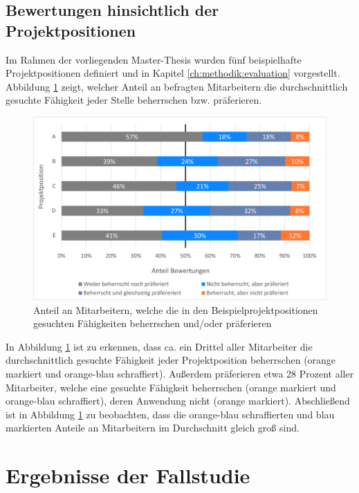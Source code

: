 \subsection{Bewertungen hinsichtlich der Projektpositionen}
\label{ch:ergebnisse:analyse:projektpositionen}
Im Rahmen der vorliegenden Master-Thesis wurden fünf beispielhafte Projektpositionen definiert und in Kapitel \ref{ch:methodik:evaluation} vorgestellt. Abbildung \ref{fig:ergebnisse:analyse:abb5} zeigt, welcher Anteil an befragten Mitarbeitern die durchschnittlich gesuchte Fähigkeit jeder Stelle beherrschen bzw. präferieren.

\begin{figure}[h]
	\centering
	\includegraphics[width=1\textwidth]{gfx/anteil-bewertungen-je-projektposition.png}
	\caption{Anteil an Mitarbeitern, welche die in den Beispielprojektpositionen gesuchten Fähigkeiten beherrschen und/oder präferieren}
	\label{fig:ergebnisse:analyse:abb5}
\end{figure}

In Abbildung \ref{fig:ergebnisse:analyse:abb5} ist zu erkennen, dass ca. ein Drittel aller Mitarbeiter die durchschnittlich gesuchte Fähigkeit jeder Projektposition beherrschen (orange markiert und orange-blau schraffiert). Außerdem präferieren etwa 28 Prozent aller Mitarbeiter, welche eine gesuchte Fähigkeit beherrschen (orange markiert und orange-blau schraffiert), deren Anwendung nicht (orange markiert). Abschließend ist in Abbildung \ref{fig:ergebnisse:analyse:abb5} zu beobachten, dass die orange-blau schraffierten und blau markierten Anteile an Mitarbeitern im Durchschnitt gleich groß sind.

\newpage
\section{Ergebnisse der Fallstudie}
\label{ch:ergebnisse:fallstudie}

